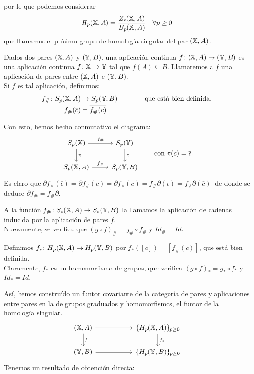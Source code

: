 por lo que podemos considerar
\[H_p({\mathbb X}, A) = \frac{Z_p({\mathbb X}, A)}{B_p({\mathbb X}, A)} \quad \forall p \geq 0 \]
que llamamos el p-ésimo grupo de homología singular del par $({\mathbb X}, A)$.

Dados dos pares $({\mathbb X}, A)$ y $({\mathbb Y}, B)$, una aplicación continua $f \colon ({\mathbb X}, A) \to ({\mathbb Y}, B)$ es una aplicación continua
$f \colon {\mathbb X} \to {\mathbb Y}$ tal que $f(A) \subseteq B$. Llamaremos a $f$ una aplicación de pares entre $({\mathbb X}, A)$ e $({\mathbb Y}, B)$. \\
Si $f$ es tal aplicación, definimos:
\begin{align*}
  f_\# \colon S_p({\mathbb X}, A) &\to S_p({\mathbb Y}, B) \hspace{4em} \text{que está bien definida.} \\
  f_\#(\overline{c}) &= \overline{f_\#(c)}
\end{align*}

Con esto, hemos hecho conmutativo el diagrama:
\[
\begin{tikzcd}
    S_p(\X) \arrow{r}{f_\#} \arrow{d}{\pi} & S_p(\Y) \arrow{d}{\pi} \\
    S_p(\X, A) \arrow{r}{f_\#} & S_p(\Y, B)
  \end{tikzcd}
  \hspace{2em} \text{con } \pi(c) = \overline{c}.
\]
Es claro que $\partial f_\#(\overline{c}) = \partial \overline{f_\#(c)} = \overline{\partial f_\#(c)} = f_\# \partial(c) = f_\# \partial(\overline{c})$,
de donde se deduce $\partial f_\# = f_\# \partial$.

A la función $f_\# \colon S_*({\mathbb X}, A) \to S_*({\mathbb Y}, B)$ la llamamos la aplicación de cadenas inducida por la aplicación de pares $f$. \\
Nuevamente, se verifica que $(g \circ f)_\# = g_\# \circ f_\#$ y $Id_\# = Id$.

Definimos $f_* \colon H_p({\mathbb X}, A) \to H_p({\mathbb Y}, B)$ por $f_*([\overline{c}]) = [f_\#(\overline{c})]$, que está bien definida. \\
Claramente, $f_*$ es un homomorfismo de grupos, que verifica $(g \circ f)_* = g_* \circ f_*$ y $Id_* = Id$.

Así, hemos construído un funtor covariante de la categoría de pares y aplicaciones entre pares en la de grupos graduados y homomorfismos,
el funtor de la homología singular.
\[
\begin{tikzcd}
  (\X, A) \arrow{r} \arrow{d}{f} & [3em] \{H_p(\X, A)\}_{p \geq 0} \arrow{d}{f_*} \\
  (\Y, B) \arrow{r} & \{H_p(\Y, B)\}_{p \geq 0}
\end{tikzcd}
\]
Tenemos un resultado de obtención directa:

